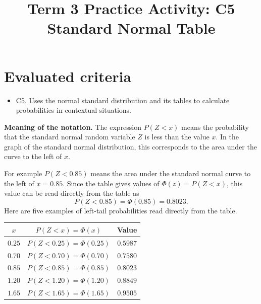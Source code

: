 \makeatletter
{}
\makeatother	





\title{Term 3 Practice Activity: C5 Standard Normal Table}
\author{}
\date{}


	\maketitle
	
	\setcounter{tocdepth}{1}
	\setcounter{secnumdepth}{2}
	\tableofcontents
	
	\section*{Evaluated criteria}
	\begin{itemize}
		\item C5. Uses the normal standard distribution and its tables to calculate probabilities in contextual situations.
	\end{itemize}
	
	
	\noindent\textbf{Meaning of the notation.}
	The expression \(P(Z<x)\) means the probability that the standard normal random variable \(Z\) is less than the value \(x\). In the graph of the standard normal distribution, this corresponds to the area under the curve to the left of \(x\).
	
	For example $P(Z<0.85)$ means the area under the standard normal curve to the left of \(x=0.85\). Since the table gives values of \(\Phi(z)=P(Z<x)\), this value can be read directly from the table as
	\[
	P(Z<0.85)=\Phi(0.85)=0.8023.
	\]
	Here are five examples of left-tail probabilities read directly from the table.
	\begin{center}
		\begin{tabular}{c c c}
			\toprule
			\(x\) & \(P(Z<x)=\Phi(x)\) & Value \\
			\midrule
			\(0.25\) & \(P(Z<0.25)=\Phi(0.25)\) & \(0.5987\) \\
			\(0.70\) & \(P(Z<0.70)=\Phi(0.70)\) & \(0.7580\) \\
			\(0.85\) & \(P(Z<0.85)=\Phi(0.85)\) & \(0.8023\) \\
			\(1.20\) & \(P(Z<1.20)=\Phi(1.20)\) & \(0.8849\) \\
			\(1.65\) & \(P(Z<1.65)=\Phi(1.65)\) & \(0.9505\) \\
			\bottomrule
		\end{tabular}
	\end{center}
	
